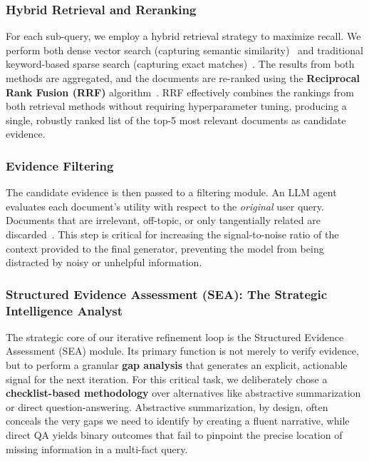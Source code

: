 \documentclass[11pt]{article}
\begin{document}
\subsubsection{Hybrid Retrieval and Reranking}

For each sub-query, we employ a hybrid retrieval strategy to maximize recall. We perform both dense vector search (capturing semantic similarity)~\cite{karpukhin2020dense} and traditional keyword-based sparse search (capturing exact matches)~\cite{robertson2009probabilistic}. The results from both methods are aggregated, and the documents are re-ranked using the \textbf{Reciprocal Rank Fusion (RRF)} algorithm~\cite{cormack2009reciprocal}. RRF effectively combines the rankings from both retrieval methods without requiring hyperparameter tuning, producing a single, robustly ranked list of the top-5 most relevant documents as candidate evidence.

\subsubsection{Evidence Filtering}

The candidate evidence is then passed to a filtering module. An LLM agent evaluates each document's utility with respect to the \emph{original} user query. Documents that are irrelevant, off-topic, or only tangentially related are discarded~\cite{liu2023lostmiddlelanguagemodels}. This step is critical for increasing the signal-to-noise ratio of the context provided to the final generator, preventing the model from being distracted by noisy or unhelpful information. 

\subsubsection{Structured Evidence Assessment (SEA): The Strategic Intelligence Analyst}

The strategic core of our iterative refinement loop is the Structured Evidence Assessment (SEA) module. Its primary function is not merely to verify evidence, but to perform a granular \textbf{gap analysis} that generates an explicit, actionable signal for the next iteration. For this critical task, we deliberately chose a \textbf{checklist-based methodology} over alternatives like abstractive summarization or direct question-answering. Abstractive summarization, by design, often conceals the very gaps we need to identify by creating a fluent narrative, while direct QA yields binary outcomes that fail to pinpoint the precise location of missing information in a multi-fact query.
\end{document}
